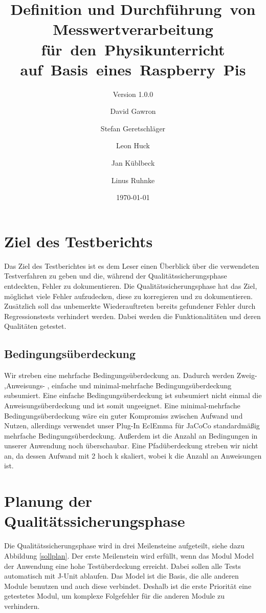 \documentclass[parskip=full]{scrartcl}
\title{Definition und Durchführung~von Messwertverarbeitung für~den~Physikunterricht auf~Basis~eines~Raspberry~Pis}
\subtitle{Version 1.0.0}
\author{David Gawron \and Stefan Geretschläger \and Leon Huck \and Jan Küblbeck \and Linus Ruhnke}
\date{\today}
\begin{document}
\maketitle

\clearpage
\tableofcontents 					%

\clearpage
\section{Ziel des Testberichts} \label{einleitung}

Das Ziel des Testberichtes ist es dem Leser einen Überblick über die verwendeten Testverfahren zu geben und die, während der Qualitätssicherungsphase entdeckten, Fehler zu dokumentieren. Die Qualitätssicherungsphase hat das Ziel, möglichst viele Fehler aufzudecken, diese zu korregieren und zu dokumentieren. Zusätzlich soll das unbemerkte Wiederauftreten bereits gefundener Fehler durch Regressionstests verhindert werden. Dabei werden die Funktionalitäten und deren Qualitäten getestet.


\subsection{Bedingungsüberdeckung}
Wir streben eine mehrfache Bedingungsüberdeckung an. Dadurch werden Zweig- ,Anweisungs- , einfache und minimal-mehrfache Bedingungsüberdeckung subsumiert. Eine einfache Bedingungsüberdeckung ist subsumiert nicht einmal die Anweisungsüberdeckung und ist somit ungeeignet. Eine minimal-mehrfache Bedingungsüberdeckung wäre ein guter Kompromiss zwischen Aufwand und Nutzen, allerdings verwendet unser Plug-In \gls{EclEmma} für \gls{JaCoCo} standardmäßig mehrfache Bedingungsüberdeckung. Außerdem ist die Anzahl an Bedingungen in unserer Anwendung noch überschaubar.
Eine Pfadüberdeckung streben wir nicht an, da dessen Aufwand mit 2 hoch k skaliert, wobei k die Anzahl an Anweisungen ist. 

\clearpage
\section{Planung der Qualitätssicherungsphase} \label{planung}

Die Qualitätssicherungsphase wird in drei Meilensteine aufgeteilt, siehe dazu Abbildung \ref{sollplan}. Der erste Meilenstein wird erfüllt, wenn das Modul Model der Anwendung eine hohe Testüberdeckung erreicht. Dabei sollen alle Tests automatisch mit J-Unit ablaufen. Das Model ist die Basis, die alle anderen Module benutzen und auch diese verbindet. Deshalb ist die erste Priorität eine getestetes Modul, um komplexe Folgefehler für die anderen Module zu verhindern. 
\end{document}
